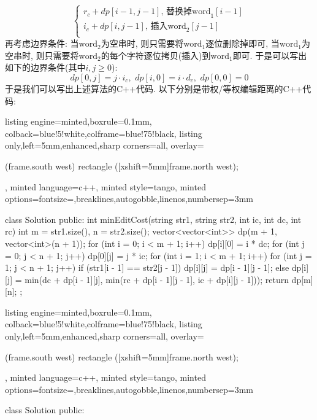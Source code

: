 \documentclass{article}
\begin{document}
\begin{homeworkProblem}
$$\begin{cases}
		r_c+dp\left[ i-1,j-1 \right] , \, \text{替换掉word}_1\left[ i-1 \right]\\
		i_c+dp\left[ i,j-1 \right] , \, \text{插入word}_2\left[ j-1 \right]\\
	\end{cases}$$
	再考虑边界条件: 当$\text{word}_2$为空串时, 则只需要将$\text{word}_1$逐位删除掉即可, 当$\text{word}_1$为空串时, 则只需要将$\text{word}_2$的每个字符逐位拷贝(插入)到$\text{word}_1$即可. 于是可以写出如下的边界条件(其中$i,j\geq 0$):
	$$
	dp\left[ 0,j \right] =j\cdot i_c, \,\,dp\left[ i,0 \right] =i\cdot d_c, \,\,dp\left[ 0,0 \right] =0
	$$
	于是我们可以写出上述算法的C++代码. 以下分别是带权/等权编辑距离的C++代码:
\begin{tcblisting}{listing engine=minted,boxrule=0.1mm,
colback=blue!5!white,colframe=blue!75!black,
listing only,left=5mm,enhanced,sharp corners=all,
overlay={\begin{tcbclipinterior} (frame.south west)
rectangle ([xshift=5mm]frame.north west);\end{tcbclipinterior}},
minted language=c++,
minted style=tango,
minted options={fontsize=\small,breaklines,autogobble,linenos,numbersep=3mm}}
class Solution {
  public:
    int minEditCost(string str1, string str2, int ic, int dc, int rc) {
        int m = str1.size(), n = str2.size();
        vector<vector<int>> dp(m + 1, vector<int>(n + 1));
        for (int i = 0; i < m + 1; i++) {
            dp[i][0] = i * dc;
        }
        for (int j = 0; j < n + 1; j++) {
            dp[0][j] = j * ic;
        }
        for (int i = 1; i < m + 1; i++) {
            for (int j = 1; j < n + 1; j++) {
                if (str1[i - 1] == str2[j - 1]) {
                    dp[i][j] = dp[i - 1][j - 1];
                } else {
                    dp[i][j] = min(dc + dp[i - 1][j], min(rc + dp[i - 1][j - 1], ic + dp[i][j - 1]));
                }
            }
        }
        return dp[m][n];
    }
};
\end{tcblisting}
\begin{tcblisting}{listing engine=minted,boxrule=0.1mm,
colback=blue!5!white,colframe=blue!75!black,
listing only,left=5mm,enhanced,sharp corners=all,
overlay={\begin{tcbclipinterior} (frame.south west)
rectangle ([xshift=5mm]frame.north west);\end{tcbclipinterior}},
minted language=c++,
minted style=tango,
minted options={fontsize=\small,breaklines,autogobble,linenos,numbersep=3mm}}
class Solution {
  public:
}
\end{tcblisting}
\end{homeworkProblem}
\end{document}
